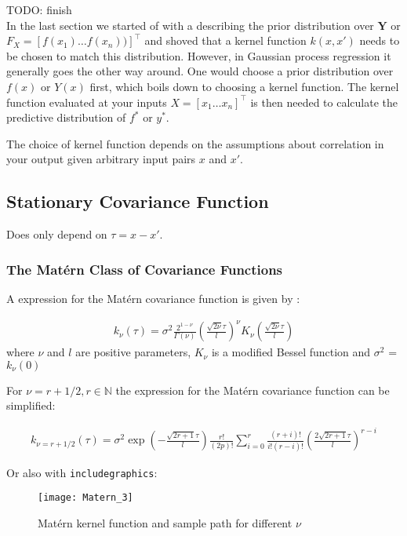 TODO: finish
\\



In the last section we started of with a describing the prior distribution over
$\mathbf{Y}$ or $F_X = [f(x_1) \dots f(x_n))]^{\top}$ and shoved that a kernel function $k(x, x')$ needs to be
chosen to match this distribution.
However, in Gaussian process regression it generally goes the other way around.
One would choose a prior distribution over $f(x)$ or $Y(x)$ first, which boils down to choosing a kernel function.
The kernel function evaluated at your inputs $X=[x_1 \dots x_n]^{\top}$ is then needed to calculate the
predictive distribution of $f^{\ast}$ or $y^{\ast}$.

The choice of kernel function depends on the assumptions about correlation in your output given arbitrary input pairs
$x$ and $x'$.


\subsection{Stationary Covariance Function}
Does only depend on $\tau = x - x'$.

\subsubsection{The Matérn Class of Covariance Functions}

A expression for the Matérn covariance function is given by \citeauthor{rasmussen_gaussian_2006}:

\begin{gather*}
    k_{\nu}(\tau) = \sigma^2 \frac{2^{1-\nu}}{\Gamma(\nu)}(\frac{\sqrt{2\nu} \tau}{l})^{\nu} K_{\nu}
    (\frac{\sqrt{2\nu} \tau}{l})
\end{gather*}
where $\nu$ and $l$ are positive parameters, $K_{\nu}$ is a modified Bessel function and
$\sigma^2$ = $k_{\nu}(0)$

For $\nu = r + 1/2, r \in \mathbb{N}$ the expression for the Matérn covariance function can be simplified:

\begin{gather}\label{kernel-matern}
    k_{\nu=r+1/2}(\tau) = \sigma^2 \exp(-\frac{\sqrt{2r + 1} \tau}{l}) \frac{r!}{(2p)!}
    \sum_{i=0}^{r} \frac{(r+i)!}{i!(r-i)!}(\frac{2 \sqrt{2 r + 1} \tau}{l})^{r-i}
\end{gather}


Or also with \texttt{includegraphics}:
\begin{figure}[hbt!]%
  \centering
  \texttt{[image: Matern\_3]} %
  \caption[Geyser data: binned histogram, Silverman's and another
  kernel]%
  {Matérn kernel function and sample path for different $\nu$}%
  \label{fig:matern}
\end{figure}


